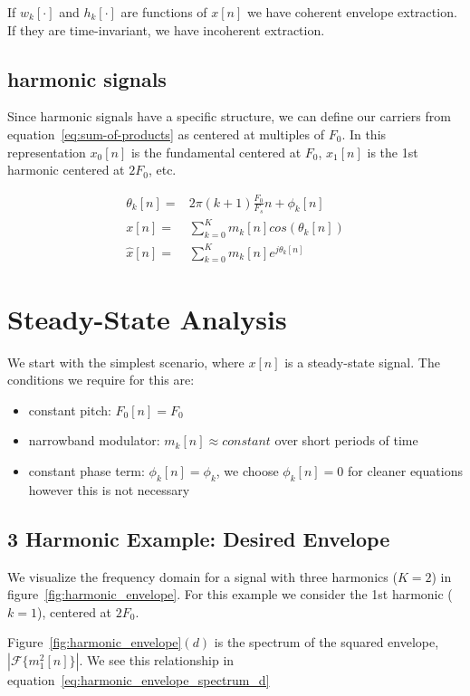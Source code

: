\documentclass [11pt, proquest] {uwthesis}[2015/03/03]
\begin{document}
If $w_k[\cdot]$ and $h_k[\cdot]$ are functions of $x[n]$ we have coherent envelope extraction.  If they are time-invariant, we have incoherent extraction.

\subsection{harmonic signals}

Since harmonic signals have a specific structure, we can define our carriers from equation~\ref{eq:sum-of-products} as centered at multiples of $F_0$. In this representation $x_0[n]$ is the fundamental centered at $F_0$, $x_1[n]$ is the 1st harmonic centered at $2F_0$, etc.

\begin{align}
\theta_k[n] =& 2\pi(k+1)\frac{F_0}{F_s}n + \phi_k[n] \\
x[n] =& \sum\limits_{k=0}^K m_k[n] cos(\theta_k[n]) \\
\widehat{x}[n] =& \sum\limits_{k=0}^K m_k[n] e^{j\theta_k[n]}
\end{align}


\section{Steady-State Analysis}

We start with the simplest scenario, where $x[n]$ is a steady-state signal.  The conditions we require for this are:

\begin{itemize}
\item constant pitch: $F_0[n] = F_0$
\item narrowband modulator: $m_k[n] \approx constant$ over short periods of time
\item constant phase term: $\phi_k[n] = \phi_k$, we choose $\phi_k[n] = 0$ for cleaner equations however this is not necessary
\end{itemize}

\subsection{3 Harmonic Example: Desired Envelope}

We visualize the frequency domain for a signal with three harmonics ($K = 2$) in figure~\ref{fig:harmonic_envelope}.  For this example we consider the 1st harmonic ($k = 1$), centered at $2F_0$.

Figure~\ref{fig:harmonic_envelope}$(d)$ is the spectrum of the squared envelope, $| \mathcal{F} \{m_1^2[n] \}|$.  We see this relationship in equation~\ref{eq:harmonic_envelope_spectrum_d}
\end{document}
